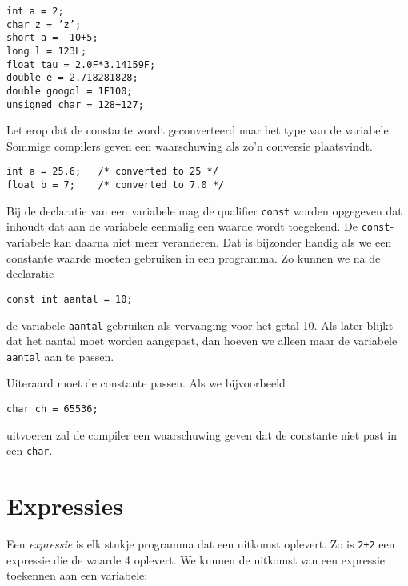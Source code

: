 \hspace*{1em}\texttt{int a = 2;}\\
\hspace*{1em}\texttt{char z = 'z';}\\
\hspace*{1em}\texttt{short a = -10+5;}\\
\hspace*{1em}\texttt{long l = 123L;}\\
\hspace*{1em}\texttt{float tau = 2.0F*3.14159F;}\\
\hspace*{1em}\texttt{double e = 2.718281828;}\\
\hspace*{1em}\texttt{double googol = 1E100;}\\
\hspace*{1em}\texttt{unsigned char = 128+127;}

Let erop dat de constante wordt geconverteerd naar het type van de variabele. Sommige compilers geven een waarschuwing als zo'n conversie plaatsvindt.

\hspace*{1em}\texttt{int a = 25.6; \ \ /* converted to 25 */}\\
\hspace*{1em}\texttt{float b = 7; \ \ \ /* converted to 7.0 */}

Bij de declaratie van een variabele mag de qualifier \texttt{const} worden opgegeven dat inhoudt dat aan  de variabele eenmalig een waarde wordt toegekend. De \texttt{const}-variabele kan daarna niet meer veranderen. Dat is bijzonder handig als we een constante waarde moeten gebruiken in een programma. Zo kunnen we na de declaratie

\hspace*{1em}\texttt{const int aantal = 10;}

de variabele \texttt{aantal} gebruiken als vervanging voor het getal 10. Als later blijkt dat het aantal moet worden aangepast, dan hoeven we alleen maar de variabele \texttt{aantal} aan te passen.

Uiteraard moet de constante passen. Als we bijvoorbeeld

\hspace*{1em}\texttt{char ch = 65536;}

uitvoeren zal de compiler een waarschuwing geven dat de constante niet past in een \texttt{char}.


\section{Expressies}
Een \textsl{expressie} is elk stukje programma dat een uitkomst oplevert. Zo is \texttt{2+2} een expressie die de waarde 4 oplevert. We kunnen de uitkomst van een expressie toekennen aan een variabele:

